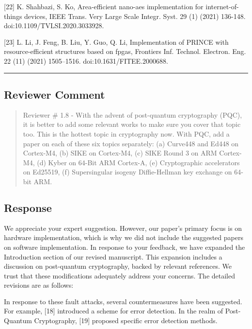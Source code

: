 [22] K. Shahbazi, S. Ko, Area-efficient nano-aes implementation for internet-of-things devices, IEEE Trans. Very Large Scale Integr. Syst. 29 (1) (2021) 136-148. doi:10.1109/TVLSI.2020.3033928.

[23] L. Li, J. Feng, B. Liu, Y. Guo, Q. Li, Implementation of PRINCE with resource-efficient structures based on fpgas, Frontiers Inf. Technol. Electron. Eng. 22 (11) (2021) 1505–1516. doi:10.1631/FITEE.2000688.

\color{black}

\noindent\rule{\linewidth}{2.0pt}

\subsection{Reviewer Comment}
\begin{mdframed}
	\begin{quote}
		Reviewer \# 1.8 - With the advent of post-quantum cryptography (PQC), it is better to add some relevant works to make sure you cover that topic too. This is the hottest topic in cryptography now. With PQC, add a paper on each of these six topics separately: (a) Curve448 and Ed448 on Cortex-M4, (b) SIKE on Cortex-M4, (c) SIKE Round 3 on ARM Cortex-M4, (d) Kyber on 64-Bit ARM Cortex-A, (e) Cryptographic accelerators on Ed25519, (f) Supersingular isogeny Diffie-Hellman key exchange on 64-bit ARM.
	\end{quote}
\end{mdframed}

\subsection{Response}


We appreciate your expert suggestion. However, our paper's primary focus is on hardware implementation, which is why we did not include the suggested papers on software implementation. In response to your feedback, we have expanded the Introduction section of our revised manuscript. This expansion includes a discussion on post-quantum cryptography, backed by relevant references. We trust that these modifications adequately address your concerns. The detailed revisions are as follows:

\color{blue}

In response to these fault attacks, several countermeasures have been suggested. For example, [18] introduced a scheme for error detection. In the realm of Post-Quantum Cryptography, [19] proposed specific error detection methods.

